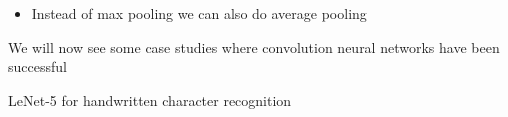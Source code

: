 


\begin{frame}
		    
	\begin{itemize}
		\item<23-> Instead of max pooling we can also do average pooling
	\end{itemize}
\end{frame}


\begin{frame}
	\begin{block}{}
		We will now see some case studies where convolution neural networks have been successful
	\end{block}
\end{frame}


\begin{frame}
	\begin{center}
		\Large{LeNet-5 for handwritten character recognition} 
	\end{center}
	
\end{frame}


